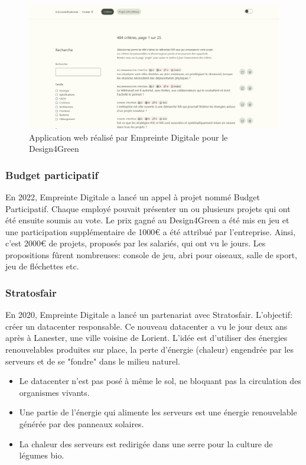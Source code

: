 \documentclass[12pt, a4paper, twoside]{article}
\begin{document}
\begin{figure}[!ht]
    \centering
    \includegraphics[width=\textwidth]{src/interface_d4g.png}
    \caption{Application web réalisé par Empreinte Digitale pour le Design4Green}
    \label{fig:design4greenl}
\end{figure}

\newpage
\subsubsection{Budget participatif}
En 2022, Empreinte Digitale a lancé un appel à projet nommé Budget Participatif. 
Chaque employé pouvait présenter un ou plusieurs projets qui ont été ensuite soumis au vote. 
Le prix gagné au Design4Green a été mis en jeu et une participation supplémentaire de 1000€ a été attribué par l'entreprise. 
Ainsi, c'est 2000€ de projets, proposés par les salariés, qui ont vu le jours. 
Les propositions fûrent nombreuses: console de jeu, abri pour oiseaux, salle de sport, jeu de fléchettes etc.

\subsubsection{Stratosfair}
En 2020, Empreinte Digitale a lancé un partenariat avec Stratosfair. 
L'objectif: créer un datacenter responsable. 
Ce nouveau datacenter a vu le jour deux ans après à Lanester, une ville voisine de Lorient. 
L'idée est d'utiliser des énergies renouvelables produites sur place, la perte d'énergie (chaleur) engendrée par les serveurs et de se "fondre" dans le milieu naturel.
\begin{itemize}
    \item Le datacenter n'est pas posé à même le sol, ne bloquant pas la circulation des organismes vivants.
    \item Une partie de l'énergie qui alimente les serveurs est une énergie renouvelable générée par des panneaux solaires.
    \item La chaleur des serveurs est redirigée dans une serre pour la culture de légumes bio.
\end{itemize}
\end{document}
